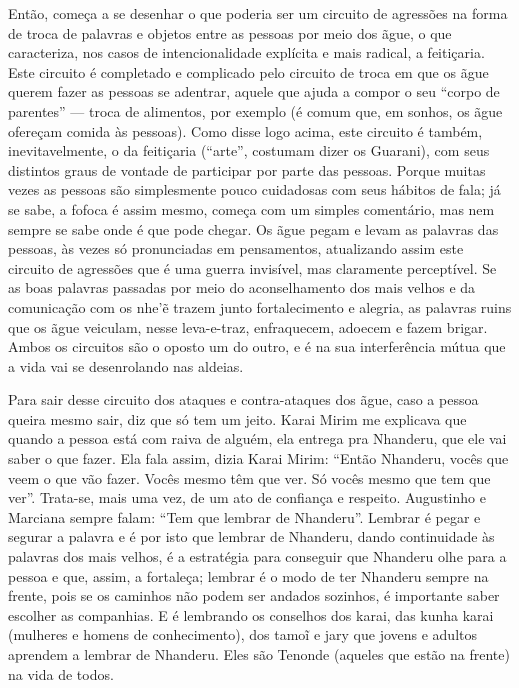 Então, começa a se desenhar o que poderia ser um circuito de agressões
na forma de troca de palavras e objetos entre as pessoas por meio dos
ãgue, o que caracteriza, nos casos de intencionalidade explícita e mais
radical, a feitiçaria. Este circuito é completado e complicado pelo
circuito de troca em que os ãgue querem fazer as pessoas se adentrar,
aquele que ajuda a compor o seu ``corpo de parentes'' --- troca de
alimentos, por exemplo (é comum que, em sonhos, os ãgue ofereçam comida
às pessoas). Como disse logo acima, este circuito é também,
inevitavelmente, o da feitiçaria (``arte'', costumam dizer os Guarani),
com seus distintos graus de vontade de participar por parte das
pessoas. Porque muitas vezes as pessoas são simplesmente pouco
cuidadosas com seus hábitos de fala; já se sabe, a fofoca é assim
mesmo, começa com um simples comentário, mas nem sempre se sabe onde é
que pode chegar.  Os ãgue pegam e levam as palavras das pessoas, às
vezes só pronunciadas em pensamentos, atualizando assim este circuito
de agressões que é uma guerra invisível, mas claramente perceptível. Se
as boas palavras passadas por meio do aconselhamento dos mais velhos e
da comunicação com os nhe’\~{e} trazem junto fortalecimento e
alegria, as palavras ruins que os ãgue veiculam, nesse leva-e-traz,
enfraquecem, adoecem e fazem brigar. Ambos os circuitos são o oposto um
do outro, e é na sua interferência mútua que a vida vai se desenrolando
nas aldeias. 

Para sair desse circuito dos ataques e contra-ataques dos ãgue, caso a
pessoa queira mesmo sair, diz que só tem um jeito. Karai Mirim me
explicava que quando a pessoa está com raiva de alguém, ela entrega pra
Nhanderu, que ele vai saber o que fazer. Ela fala assim, dizia Karai
Mirim: ``Então Nhanderu, vocês que veem o que vão fazer. Vocês mesmo têm
que ver. Só vocês mesmo que tem que ver''. Trata-se, mais uma vez, de um
ato de confiança e respeito. Augustinho e Marciana sempre falam: ``Tem
que lembrar de Nhanderu''. Lembrar é pegar e segurar a palavra e é por
isto que lembrar de Nhanderu, dando continuidade às palavras dos mais
velhos, é a estratégia para conseguir que Nhanderu olhe para a pessoa e
que, assim, a fortaleça; lembrar é o modo de ter Nhanderu sempre na
frente, pois se os caminhos não podem ser andados sozinhos, é
importante saber escolher as companhias. E é lembrando os conselhos dos
karai, das kunha karai (mulheres e homens de conhecimento), dos
tamo\~{i} e jary que jovens e adultos aprendem a lembrar de Nhanderu.
Eles são Tenonde (aqueles que estão na frente) na vida de todos.

